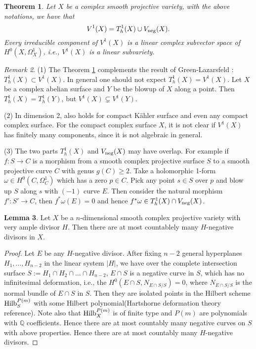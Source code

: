 \documentclass[a4paper,12pt,reqno]{amsart}
\newtheorem{theorem}{Theorem}[section]
\theoremstyle{plain}
\theoremstyle{definition}
\newtheorem{lemma}[theorem]{Lemma}
\theoremstyle{remark}
\newtheorem{remark}[theorem]{Remark}
\newcommand{\Q}{\mathbb Q}
\begin{document}
\begin{theorem}\label{Thm:Proj-codim1}
 Let $X$ be a complex smooth projective variety, with the above notations, we have that 
$$V^1(X)= T_h^1(X)\cup V_{\textnormal{neg}}(X).
$$
Every irreducible component of $V^1(X)$ is a linear complex subvector space of $H^0(X, \Omega_X^1)$, i.e., $V^1(X)$ is a linear subvariety. %
\end{theorem}

\begin{remark} (1) The Theorem \ref{Thm:Proj-codim1} complements the result of Green-Lazarsfeld \cite{GL87}: $T_h^1(X) \subset V^1(X)$. In general one should not expect $T_h^1(X) = V^1(X)$. Let $X$ be a complex abelian surface and $Y$ be the blowup of $X$ along a point. Then $T_h^1(X)=T_h^1(Y)$, but  $V^1(X)\subsetneq V^1(Y)$.

(2) In dimension 2, \cite[Theorem 2]{Sp88} also holds for compact K\"ahler surface and even any compact complex surface. For the compact complex surface $X$, it is not clear if $V^1(X)$ has finitely many components, since it is not algebraic in general.

(3) The two parts $T_h^1(X)$ and $V_{\textnormal{neg}}(X)$ may have overlap. For example if $f: S\to C$ is a morphism from a smooth complex projective surface $S$ to a smooth projective curve $C$ with genus $g(C)\geq2$. Take a holomorphic 1-form $\omega\in H^0(C, \Omega_C^1)$ which has a zero $p\in C$. Pick any point $s\in S$ over $p$ and blow up $S$ along $s$ with $(-1)$ curve $E$. Then consider the natural morphism $f': S'\to C$, then $f^*\omega(E)=0$ and hence $f^*\omega\in T_h^1(X)\cap V_{\textnormal{neg}}(X)$.
\end{remark}

\begin{lemma} \label{countable} Let $X$ be a $n$-dimensional smooth complex projective variety with very ample divisor $H$. Then there are at most countablely many $H$-negative divisors in $X$.
\end{lemma}

\begin{proof}
Let $E$ be any $H$-negative divisor. After fixing $n-2$ general hyperplanes $H_1, \ldots, H_{n-2}$ in the linear system $|H|$, we have over the complete intersection surface $S:=H_1\cap H_2\cap\ldots\cap H_{n-2}$, $E\cap S$ is a negative curve in $S$, which has no infinitesimal deformation, i.e., the $H^0(E\cap S, N_{E\cap S/S})=0$, where $N_{E\cap S/S}$ is the normal bundle of $E\cap S$ in $S$. Then they are isolated points in the Hilbert scheme $\textnormal{Hilb}_S^{P(m)}$ with some Hilbert polynomial{\color{red}(Hartshorne deformation theory reference)}. Note also that $\textnormal{Hilb}_X^{P(m)}$ is of finite type and $P(m)$ are polynomials with $\Q$ coefficients. Hence there are at most countably many negative curves on $S$ with above properties. Hence there are at most countably many $H$-negative divisors.
\end{proof}
\end{document}
